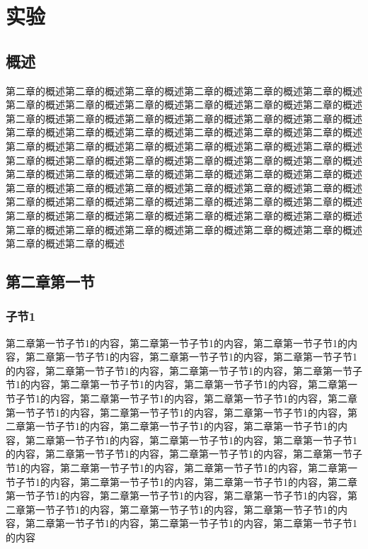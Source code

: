 \documentclass[unicode,pdfcover]{hquthesis}
\begin{document}
\chapter{实验}

\section{概述}
第二章的概述第二章的概述第二章的概述第二章的概述第二章的概述第二章的概述第二章的概述第二章的概述第二章的概述第二章的概述第二章的概述第二章的概述第二章的概述第二章的概述第二章的概述第二章的概述第二章的概述第二章的概述第二章的概述第二章的概述第二章的概述第二章的概述第二章的概述第二章的概述第二章的概述第二章的概述第二章的概述第二章的概述第二章的概述第二章的概述第二章的概述第二章的概述第二章的概述第二章的概述第二章的概述第二章的概述第二章的概述第二章的概述第二章的概述第二章的概述第二章的概述第二章的概述第二章的概述第二章的概述第二章的概述第二章的概述第二章的概述第二章的概述第二章的概述第二章的概述第二章的概述第二章的概述第二章的概述第二章的概述第二章的概述第二章的概述第二章的概述第二章的概述第二章的概述第二章的概述第二章的概述第二章的概述第二章的概述第二章的概述第二章的概述第二章的概述第二章的概述第二章的概述

\section{第二章第一节}

\subsection{子节1}

第二章第一节子节1的内容，第二章第一节子节1的内容，第二章第一节子节1的内容，第二章第一节子节1的内容，第二章第一节子节1的内容，第二章第一节子节1的内容，第二章第一节子节1的内容，第二章第一节子节1的内容，第二章第一节子节1的内容，第二章第一节子节1的内容，第二章第一节子节1的内容，第二章第一节子节1的内容，第二章第一节子节1的内容，第二章第一节子节1的内容，第二章第一节子节1的内容，第二章第一节子节1的内容，第二章第一节子节1的内容，第二章第一节子节1的内容，第二章第一节子节1的内容，第二章第一节子节1的内容，第二章第一节子节1的内容，第二章第一节子节1的内容，第二章第一节子节1的内容，第二章第一节子节1的内容，第二章第一节子节1的内容，第二章第一节子节1的内容，第二章第一节子节1的内容，第二章第一节子节1的内容，第二章第一节子节1的内容，第二章第一节子节1的内容，第二章第一节子节1的内容，第二章第一节子节1的内容，第二章第一节子节1的内容，第二章第一节子节1的内容，第二章第一节子节1的内容，第二章第一节子节1的内容，第二章第一节子节1的内容，第二章第一节子节1的内容，第二章第一节子节1的内容，第二章第一节子节1的内容
\end{document}
